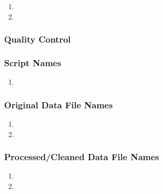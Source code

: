 \begin{enumerate}
\item 
\item
\end{enumerate}

\subsubsection*{Quality Control}

\subsubsection*{Script Names}

\begin{enumerate}
\item 
\end{enumerate}

\subsubsection*{Original Data File Names}

\begin{enumerate}
\item 
\item 
\end{enumerate}

\subsubsection*{Processed/Cleaned Data File Names}

\begin{enumerate}
\item 
\item 
\end{enumerate}
